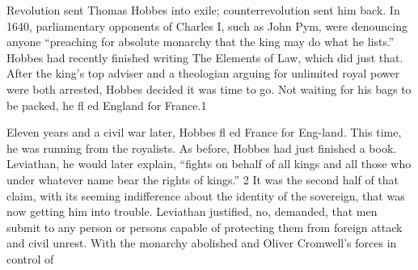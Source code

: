  \par 
Revolution sent Thomas Hobbes into exile; counterrevolution sent him back. In 1640, parliamentary opponents of Charles I, such as John Pym, were denouncing anyone “preaching for absolute monarchy that the king may do what he lists.” Hobbes had recently finished writing The Elements of Law, which did just that. After the king’s top adviser and a theologian arguing for unlimited royal power were both arrested, Hobbes decided it was time to go. Not waiting for his bags to be packed, he fl ed England for France.{\color{blue}1}
 \par 
Eleven years and a civil war later, Hobbes fl ed France for Eng-land. This time, he was running from the royalists. As before, Hobbes had just finished a book. Leviathan, he would later explain, “fights on behalf of all kings and all those who under whatever name bear the rights of kings.” {\color{blue}2} It was the second half of that claim, with its seeming indifference about the identity of the sovereign, that was now getting him into trouble. Leviathan justified, no, demanded, that men submit to any person or persons capable of protecting them from foreign attack and civil unrest. With the monarchy abolished and Oliver Cromwell’s forces in control of